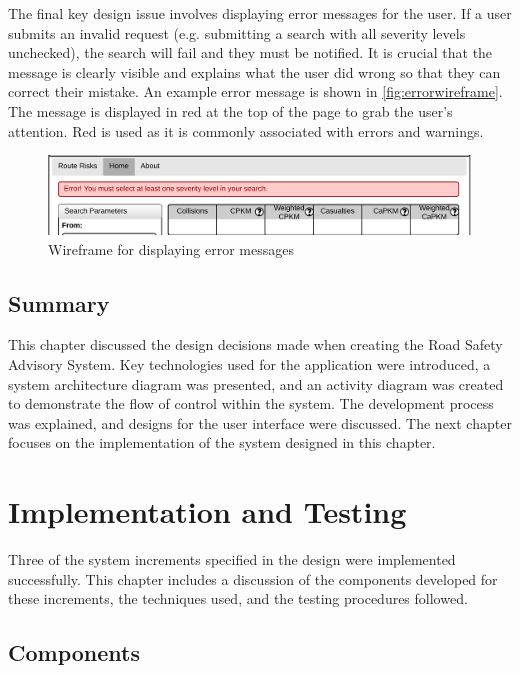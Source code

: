 \documentclass[authoryearcitations]{UoYCSproject}
\begin{document}
The final key design issue involves displaying error messages for the user. If a user submits an invalid request (e.g. submitting a search with all severity levels unchecked), the search will fail and they must be notified. It is crucial that the message is clearly visible and explains what the user did wrong so that they can correct their mistake. An example error message is shown in \autoref{fig:errorwireframe}. The message is displayed in red at the top of the page to grab the user's attention. Red is used as it is commonly associated with errors and warnings.

\begin{figure}
	\center
	\includegraphics[scale=0.7]{ErrorWireframe}
	\caption{Wireframe for displaying error messages}
	\label{fig:errorwireframe}
\end{figure}

\section{Summary}

This chapter discussed the design decisions made when creating the Road Safety Advisory System. Key technologies used for the application were introduced, a system architecture diagram was presented, and an activity diagram was created to demonstrate the flow of control within the system. The development process was explained, and designs for the user interface were discussed. The next chapter focuses on the implementation of the system designed in this chapter.

\chapter{Implementation and Testing}

Three of the system increments specified in the design were implemented successfully. This chapter includes a discussion of the components developed for these increments, the techniques used, and the testing procedures followed.

\section{Components}
\end{document}
